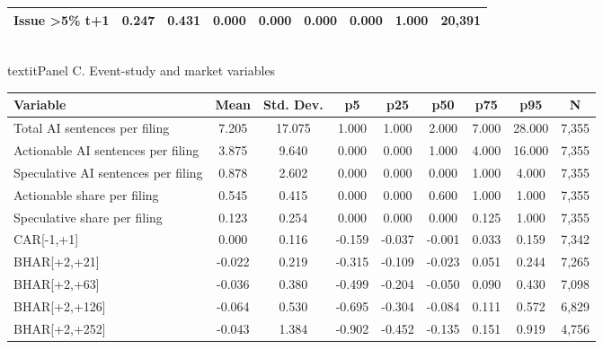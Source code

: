 \begin{table}[!htbp]
\begin{tabular}{lcccccccc}
Issue >5\% t+1 & 0.247 & 0.431 & 0.000 & 0.000 & 0.000 & 0.000 & 1.000 & 20,391 \\
\hline
\end{tabular}
\vspace{0.4em}
\\textit{Panel C. Event-study and market variables}\\
\begin{tabular}{lcccccccc}
\hline
Variable & Mean & Std. Dev. & p5 & p25 & p50 & p75 & p95 & N \\
\hline
Total AI sentences per filing & 7.205 & 17.075 & 1.000 & 1.000 & 2.000 & 7.000 & 28.000 & 7,355 \\
Actionable AI sentences per filing & 3.875 & 9.640 & 0.000 & 0.000 & 1.000 & 4.000 & 16.000 & 7,355 \\
Speculative AI sentences per filing & 0.878 & 2.602 & 0.000 & 0.000 & 0.000 & 1.000 & 4.000 & 7,355 \\
Actionable share per filing & 0.545 & 0.415 & 0.000 & 0.000 & 0.600 & 1.000 & 1.000 & 7,355 \\
Speculative share per filing & 0.123 & 0.254 & 0.000 & 0.000 & 0.000 & 0.125 & 1.000 & 7,355 \\
CAR[-1,+1] & 0.000 & 0.116 & -0.159 & -0.037 & -0.001 & 0.033 & 0.159 & 7,342 \\
BHAR[+2,+21] & -0.022 & 0.219 & -0.315 & -0.109 & -0.023 & 0.051 & 0.244 & 7,265 \\
BHAR[+2,+63] & -0.036 & 0.380 & -0.499 & -0.204 & -0.050 & 0.090 & 0.430 & 7,098 \\
BHAR[+2,+126] & -0.064 & 0.530 & -0.695 & -0.304 & -0.084 & 0.111 & 0.572 & 6,829 \\
BHAR[+2,+252] & -0.043 & 1.384 & -0.902 & -0.452 & -0.135 & 0.151 & 0.919 & 4,756 \\
\hline
\end{tabular}
\end{table}
